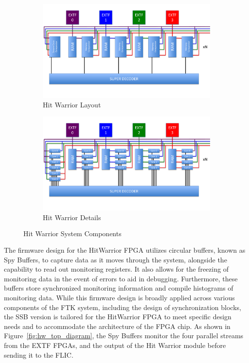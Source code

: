\begin{figure}[ht]
  \centering
  \begin{subfigure}[b]{0.5\textwidth}
    \includegraphics[width=\textwidth]{figures/ftk/hw_layout.pdf}
    \caption{Hit Warrior Layout}
    \label{fig:hw_layout}
  \end{subfigure}%
  \hfill
  \begin{subfigure}[b]{0.5\textwidth}
    \includegraphics[width=\textwidth]{figures/ftk/hw_details.pdf}
    \caption{Hit Warrior Details}
    \label{fig:hw_details}
  \end{subfigure}
  \caption{Hit Warrior System Components}
  \label{fig:hit_warrior}
\end{figure}

The firmware design for the HitWarrior FPGA utilizes circular buffers, known as Spy Buffers, to capture data as it moves through the system, alongside the capability to read out monitoring registers. It also allows for the freezing of monitoring data in the event of errors to aid in debugging. Furthermore, these buffers store synchronized monitoring information and compile histograms of monitoring data. While this firmware design is broadly applied across various components of the FTK system, including the design of synchronization blocks, the SSB version is tailored for the HitWarrior FPGA to meet specific design needs and to accommodate the architecture of the FPGA chip.
As shown in Figure~\ref{fig:hw_top_diagram}, the Spy Buffers monitor the four parallel streams from the EXTF FPGAs, and the output of the Hit Warrior module before sending it to the FLIC.

